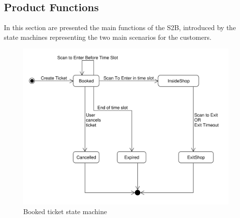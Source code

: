 
\vfill
\pagebreak

\subsection{Product Functions}

In this section are presented the main functions of the S2B, introduced by the state machines representing the two main scenarios for the customers.

\begin{figure}[H]
    \centering
    \includegraphics[width=\textwidth]{Images/UML_booked_ticket.pdf}
    \caption{\label{fig:Booked_Ticket_State}Booked ticket state machine}
\end{figure}

\vfill
\pagebreak

